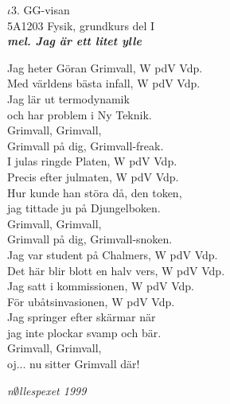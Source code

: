 \documentclass[a6paper,10pt]{article}
\newcommand{\mel}[1]{\small\textbf{\textit{mel. #1 \\}}}
\begin{document}
\setlength{\oddsidemargin}{-0.37in}
\noindent
\begin{center}
\Large $\iota3$. GG-visan \\ 
\footnotesize5A1203 Fysik, grundkurs del I\\
\mel{Jag är ett litet ylle}
\end{center}
Jag heter Göran Grimvall, W pdV Vdp. \\
Med världens bästa infall, W pdV Vdp. \\
Jag lär ut termodynamik \\
och har problem i Ny Teknik. \\
Grimvall, Grimvall, \\
Grimvall på dig, Grimvall-freak. 
\vspace{5pt} \\
I julas ringde Platen, W pdV Vdp. \\
Precis efter julmaten, W pdV Vdp. \\
Hur kunde han störa då, den token, \\
jag tittade ju på Djungelboken. \\
Grimvall, Grimvall, \\
Grimvall på dig, Grimvall-snoken. 
\vspace{5pt} \\
Jag var student på Chalmers, W pdV Vdp. \\
Det här blir blott en halv vers, W pdV Vdp. 
\vspace{5pt} \\
Jag satt i kommissionen, W pdV Vdp. \\
För ubåtsinvasionen, W pdV Vdp. \\
Jag springer efter skärmar när \\
jag inte plockar svamp och bär. 
\vspace{5pt} \\
Grimvall, Grimvall,\\
 oj... nu sitter Grimvall där! 
\begin{flushright}
\textit{n$\emptyset$llespexet 1999}
\end{flushright}
\end{document}
